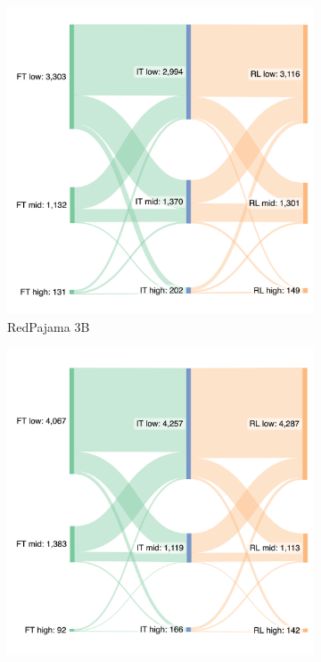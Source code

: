 \begin{figure}
\centering
\begin{subfigure}{.5\textwidth}
  \centering
  \includegraphics[width=.9\linewidth]{Figs/sankeymatic-redpajama.png}
  \caption{RedPajama 3B}
  \label{fig:sub1}
\end{subfigure}%
\begin{subfigure}{.5\textwidth}
  \centering
  \includegraphics[width=.9\linewidth]{Figs/sankeymatic-falcon.png}

\end{subfigure}
\end{figure}
